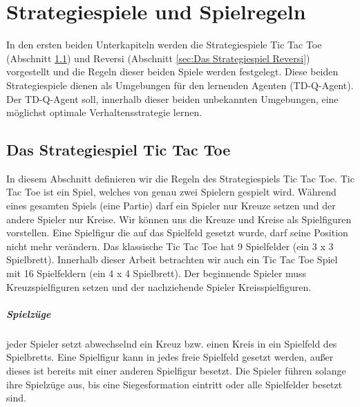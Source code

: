 \chapter{Strategiespiele und Spielregeln}
\label{cha:Strategiespiele und Spielregeln}

In den ersten beiden Unterkapiteln werden die Strategiespiele Tic Tac Toe (Abschnitt \ref{sec:Das Strategiespiel Tic Tac Toe}) und Reversi (Abschnitt \ref{sec:Das Strategiespiel Reversi}) vorgestellt und die Regeln dieser beiden Spiele werden festgelegt. Diese beiden Strategiespiele dienen als Umgebungen für den lernenden Agenten (TD-Q-Agent). Der TD-Q-Agent soll, innerhalb dieser beiden unbekannten Umgebungen, eine möglichst optimale Verhaltensstrategie lernen. \\


\section{Das Strategiespiel Tic Tac Toe}
\label{sec:Das Strategiespiel Tic Tac Toe}

In diesem Abschnitt definieren wir die Regeln des Strategiespiels Tic Tac Toe. Tic Tac Toe ist ein Spiel, welches von genau zwei Spielern gespielt wird. Während eines gesamten Spiels (eine Partie) darf ein Spieler nur Kreuze setzen und der andere Spieler nur Kreise. Wir können uns die Kreuze und Kreise als Spielfiguren vorstellen. Eine Spielfigur die auf das Spielfeld gesetzt wurde, darf seine Position nicht mehr verändern. Das klassische Tic Tac Toe hat 9 Spielfelder (ein 3 x 3 Spielbrett). Innerhalb dieser Arbeit betrachten wir auch ein Tic Tac Toe Spiel mit 16 Spielfeldern (ein 4 x 4 Spielbrett). Der beginnende Spieler muss Kreuzspielfiguren setzen und der nachziehende Spieler Kreisspielfiguren. \\

\paragraph{Spielzüge} jeder Spieler setzt abwechselnd ein Kreuz bzw. einen Kreis in ein Spielfeld des Spielbretts. Eine Spielfigur kann in jedes freie Spielfeld gesetzt werden, außer dieses ist bereits mit einer anderen Spielfigur besetzt. Die Spieler führen solange ihre Spielzüge aus, bis eine Siegesformation eintritt oder alle Spielfelder besetzt sind. 

